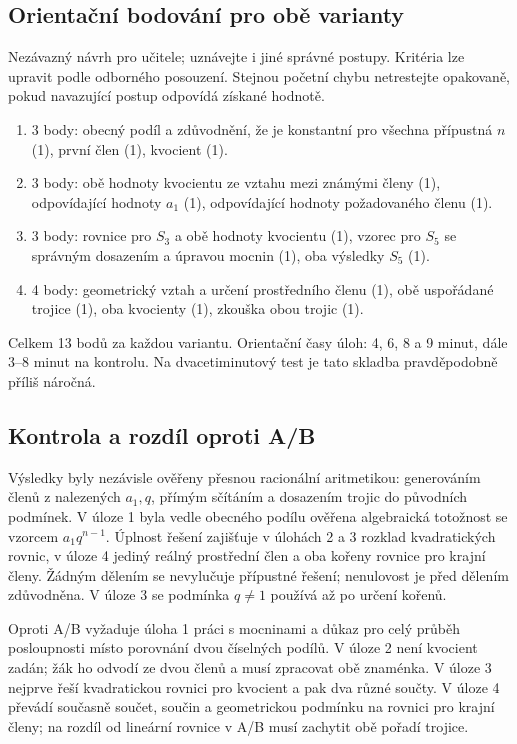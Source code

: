 \documentclass[a4paper,10pt]{article}
\begin{document}
\subsection*{Orientační bodování pro obě varianty}
Nezávazný návrh pro učitele; uznávejte i jiné správné postupy.
Kritéria lze upravit podle odborného posouzení. Stejnou početní chybu
netrestejte opakovaně, pokud navazující postup odpovídá získané hodnotě.
\begin{enumerate}
\item 3 body: obecný podíl a zdůvodnění, že je konstantní pro všechna
přípustná $n$ (1), první člen (1), kvocient (1).
\item 3 body: obě hodnoty kvocientu ze vztahu mezi známými členy (1),
odpovídající hodnoty $a_1$ (1), odpovídající hodnoty požadovaného členu (1).
\item 3 body: rovnice pro $S_3$ a obě hodnoty kvocientu (1), vzorec pro
$S_5$ se správným dosazením a úpravou mocnin (1), oba výsledky $S_5$ (1).
\item 4 body: geometrický vztah a určení prostředního členu (1),
obě uspořádané trojice (1), oba kvocienty (1), zkouška obou trojic (1).
\end{enumerate}
Celkem 13 bodů za každou variantu.
Orientační časy úloh: 4, 6, 8 a 9 minut, dále 3--8 minut na kontrolu.
Na dvacetiminutový test je tato skladba pravděpodobně příliš náročná.

\subsection*{Kontrola a rozdíl oproti A/B}
Výsledky byly nezávisle ověřeny přesnou racionální aritmetikou:
generováním členů z nalezených $a_1,q$, přímým sčítáním a dosazením
trojic do původních podmínek. V úloze 1 byla vedle obecného podílu
ověřena algebraická totožnost se vzorcem $a_1q^{n-1}$.
Úplnost řešení zajišťuje v úlohách 2 a 3 rozklad kvadratických rovnic,
v úloze 4 jediný reálný prostřední člen a oba kořeny rovnice pro krajní členy.
Žádným dělením se nevylučuje přípustné řešení; nenulovost je před dělením
zdůvodněna. V úloze 3 se podmínka $q\ne1$ používá až po určení kořenů.

Oproti A/B vyžaduje úloha 1 práci s mocninami a důkaz pro celý průběh
posloupnosti místo porovnání dvou číselných podílů.
V úloze 2 není kvocient zadán; žák ho odvodí ze dvou členů a musí
zpracovat obě znaménka. V úloze 3 nejprve řeší kvadratickou rovnici
pro kvocient a pak dva různé součty. V úloze 4 převádí současně součet,
součin a geometrickou podmínku na rovnici pro krajní členy;
na rozdíl od lineární rovnice v A/B musí zachytit obě pořadí trojice.
\end{document}
